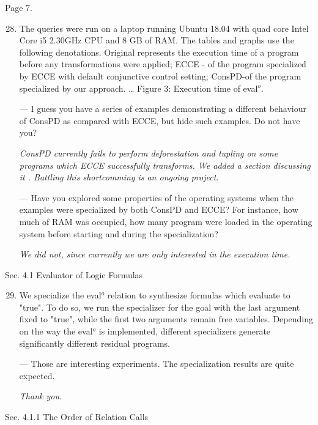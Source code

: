 Page 7.

\begin{enumerate}
  \setcounter{enumi}{27}

  \item {The queries were run on a laptop running Ubuntu 18.04 with quad core Intel Core i5 2.30GHz CPU and 8 GB of RAM. The tables and graphs use the following denotations. Original represents the execution time of a program before any transformations were applied; ECCE - of the program specialized by ECCE with default conjunctive control setting; ConsPD-of the program specialized by our approach. … Figure 3: Execution time of eval$^o$.

  --- I guess you have a series of examples demonstrating a different behaviour of ConsPD as compared with ECCE, but hide such examples. Do not have you?

  \emph{ConsPD currently fails to perform deforestation and tupling on some programs which ECCE successfully transforms. We added a section discussing it . Battling this shortcomming is an ongoing project. }

  --- Have you explored some properties of the operating systems when the examples were specialized by both ConsPD and ECCE? For instance, how much of RAM was occupied, how many program were loaded in the operating system before starting and during the specialization?

  \emph{We did not, since currently we are only interested in the execution time.}
  }

\end{enumerate}

Sec. 4.1 Evaluator of Logic Formulas

\begin{enumerate}
  \setcounter{enumi}{28}
  \item {
    We specialize the eval$^o$ relation to synthesize formulas which evaluate to "true". To do so, we run the specializer for the goal with the last argument fixed to "true", while the first two arguments remain free variables. Depending on the way the eval$^o$ is implemented, different specializers generate significantly different residual programs.

    --- Those are interesting experiments. The specialization results are quite expected.

    \emph{Thank you.}
  }
\end{enumerate}

Sec. 4.1.1 The Order of Relation Calls

